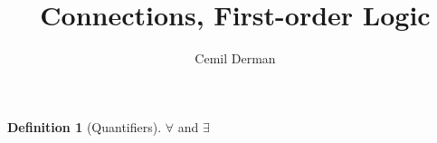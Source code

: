 \documentclass{article}
\title{Connections, First-order Logic}
\author{Cemil Derman}
\theoremstyle{definition}
\newtheorem{definition}{Definition}[section]
\begin{document}
    \maketitle
    \begin{definition}[Quantifiers]
      $\forall$ and $\exists$ 
      
    \end{definition}
\end{document}

